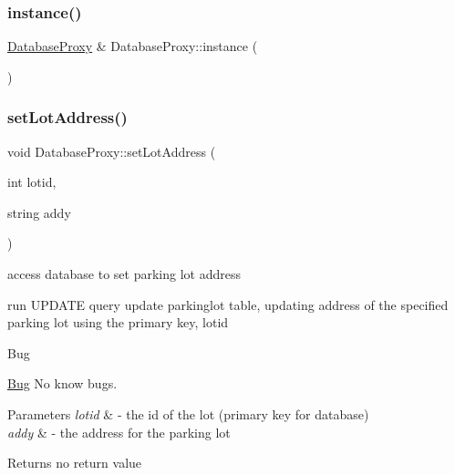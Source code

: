 \subsubsection{\texorpdfstring{instance()}{instance()}}
{\footnotesize\ttfamily \mbox{\hyperlink{class_database_proxy}{Database\+Proxy}} \& Database\+Proxy\+::instance (\begin{DoxyParamCaption}{ }\end{DoxyParamCaption})\hspace{0.3cm}{\ttfamily [static]}}

\mbox{\label{class_database_proxy_aaf1a1456f4df83fdd72b8b6578e2efa2}} 
\subsubsection{\texorpdfstring{set\+Lot\+Address()}{setLotAddress()}}
{\footnotesize\ttfamily void Database\+Proxy\+::set\+Lot\+Address (\begin{DoxyParamCaption}\item[{int}]{lotid,  }\item[{string}]{addy }\end{DoxyParamCaption})}



access database to set parking lot address 

run U\+P\+D\+A\+TE query update parkinglot table, updating address of the specified parking lot using the primary key, lotid

\begin{DoxyRefDesc}{Bug}
\item[\mbox{\hyperlink{bug__bug000020}{Bug}}]No know bugs. \end{DoxyRefDesc}

\begin{DoxyParams}{Parameters}
{\em lotid} & -\/ the id of the lot (primary key for database) \\
\hline
{\em addy} & -\/ the address for the parking lot \\
\hline
\end{DoxyParams}
\begin{DoxyReturn}{Returns}
no return value 
\end{DoxyReturn}
\mbox{\label{class_database_proxy_a963f6ca045641c4f04b9c22b80134e1c}} 
